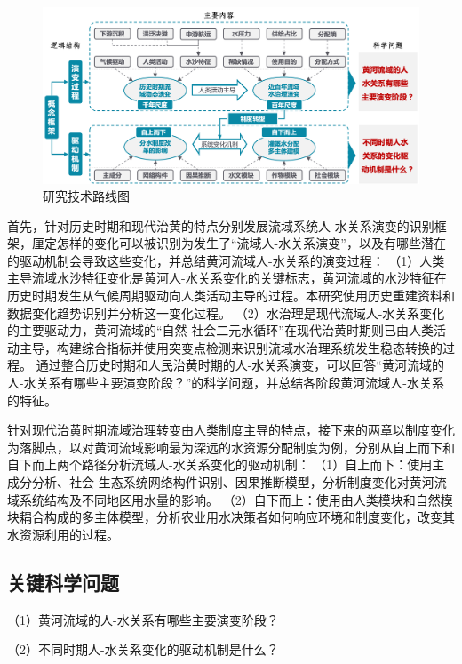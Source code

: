 \begin{figure}[!ht] %
    \includegraphics[width=\textwidth]{img/ch1/ch1_workflow.png}
    \caption{研究技术路线图}\label{ch1:fig:workflow}
\end{figure}

首先，针对历史时期和现代治黄的特点分别发展流域系统人-水关系演变的识别框架，厘定怎样的变化可以被识别为发生了“流域人-水关系演变”，以及有哪些潜在的驱动机制会导致这些变化，并总结黄河流域人-水关系的演变过程：
（1）人类主导流域水沙特征变化是黄河人-水关系变化的关键标志，黄河流域的水沙特征在历史时期发生从气候周期驱动向人类活动主导的过程。本研究使用历史重建资料和数据变化趋势识别并分析这一变化过程。
（2）水治理是现代流域人-水关系变化的主要驱动力，黄河流域的“自然-社会二元水循环”在现代治黄时期则已由人类活动主导，构建综合指标并使用突变点检测来识别流域水治理系统发生稳态转换的过程。
通过整合历史时期和人民治黄时期的人-水关系演变，可以回答“黄河流域的人-水关系有哪些主要演变阶段？”的科学问题，并总结各阶段黄河流域人-水关系的特征。

针对现代治黄时期流域治理转变由人类制度主导的特点，接下来的两章以制度变化为落脚点，以对黄河流域影响最为深远的水资源分配制度为例，分别从自上而下和自下而上两个路径分析流域人-水关系变化的驱动机制：
（1）自上而下：使用主成分分析、社会-生态系统网络构件识别、因果推断模型，分析制度变化对黄河流域系统结构及不同地区用水量的影响。
（2）自下而上：使用由人类模块和自然模块耦合构成的多主体模型，分析农业用水决策者如何响应环境和制度变化，改变其水资源利用的过程。

\subsection{关键科学问题}

（1）黄河流域的人-水关系有哪些主要演变阶段？

（2）不同时期人-水关系变化的驱动机制是什么？
